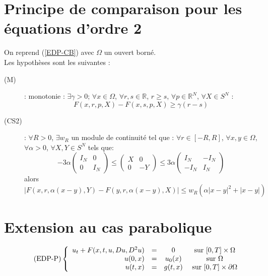 \section{Principe de comparaison pour les équations d'ordre 2}
On reprend (\ref{EDP-CB}) avec $\Omega$ un ouvert borné.\\
Les hypothèses sont les suivantes : \begin{description}
	\item[\label{Mono2} (M)] : monotonie : $\exists\gamma>0$; $\forall x\in\Omega$, $\forall r,s\in\mathbb{R}$, $r\geq s$, $\forall p\in\mathbb{R}^N$, $\forall X\in S^N$ : \[F(x,r,p,X)-F(x,s,p,X)\geq \gamma(r-s)\]
	\item[\label{CS2} (CS2)] : $\forall R>0$, $\exists w_R$ un module de continuité tel que : $\forall r\in[-R,R]$, $\forall x,y\in\Omega$, $\forall\alpha>0$, $\forall X,Y\in S^N$ tels que: 
\begin{equation}\label{matCS2}
-3\alpha\begin{pmatrix} I_N & 0 \\ 0 & I_N \end{pmatrix} \leq \begin{pmatrix} X & 0 \\ 0 & -Y \end{pmatrix} \leq 3\alpha \begin{pmatrix} I_N & -I_N \\ -I_N & I_N \end{pmatrix}
\end{equation}
alors \[|F(x,r,\alpha(x-y),Y)-F(y,r,\alpha(x-y),X)|\leq w_R\left(\alpha|x-y|^2+|x-y|\right)\]
\end{description}


\section{Extension au cas parabolique}
\begin{equation} \label{EDPP} \tag{EDP-P} 
\left\{ \begin{array}{r c c c}
	u_t+F(x,t,u,Du,D^2u)&=&0 &\text{ sur } [0,T]\times\Omega\\
	u(0,x)&=&u_0(x) &\text{ sur } \Omega\\
	u(t,x)&=&g(t,x) &\text{ sur } [0,T]\times\partial\Omega
\end{array}\right.
\end{equation}


